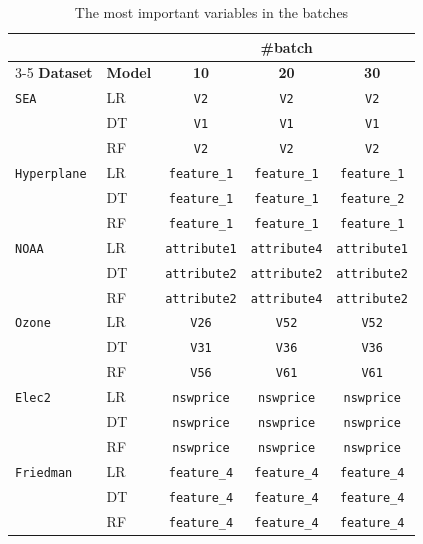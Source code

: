 \begin{table}[H]
    \centering
    \small
    \caption{The most important variables in the batches}
    \label{tab:vip_batch}
    \begin{tabular}{llccc}\toprule
                            &       & \multicolumn{3}{c}{\textbf{\#batch}}\\\cmidrule(lr){3-5}
        \textbf{Dataset}    & \textbf{Model} & \textbf{10}                    & \textbf{20}                    & \textbf{30} \\\midrule
        \texttt{SEA} & LR & \texttt{V2} & \texttt{V2} & \texttt{V2} \\
                            & DT & \texttt{V1} & \texttt{V1} & \texttt{V1} \\
                            & RF & \texttt{V2} & \texttt{V2} & \texttt{V2} \\
        \midrule
        \texttt{Hyperplane} & LR & \texttt{feature\_1} & \texttt{feature\_1} & \texttt{feature\_1} \\
                            & DT & \texttt{feature\_1} & \texttt{feature\_1} & \texttt{feature\_2} \\
                            & RF & \texttt{feature\_1} & \texttt{feature\_1} & \texttt{feature\_1} \\
        \midrule
        \texttt{NOAA} & LR & \texttt{attribute1} & \texttt{attribute4} & \texttt{attribute1} \\
                            & DT & \texttt{attribute2} & \texttt{attribute2} & \texttt{attribute2} \\
                            & RF & \texttt{attribute2} & \texttt{attribute4} & \texttt{attribute2} \\
        \midrule
        \texttt{Ozone} & LR & \texttt{V26} & \texttt{V52} & \texttt{V52} \\
                            & DT & \texttt{V31} & \texttt{V36} & \texttt{V36} \\
                            & RF & \texttt{V56} & \texttt{V61} & \texttt{V61} \\
        \midrule
        \texttt{Elec2} & LR & \texttt{nswprice} & \texttt{nswprice} & \texttt{nswprice} \\
                            & DT & \texttt{nswprice} & \texttt{nswprice} & \texttt{nswprice} \\
                            & RF & \texttt{nswprice} & \texttt{nswprice} & \texttt{nswprice} \\
        \midrule
        \texttt{Friedman} & LR & \texttt{feature\_4} & \texttt{feature\_4} & \texttt{feature\_4} \\
                            & DT & \texttt{feature\_4} & \texttt{feature\_4} & \texttt{feature\_4} \\
                            & RF & \texttt{feature\_4} & \texttt{feature\_4} & \texttt{feature\_4} \\
        \midrule
    \end{tabular}
\end{table}


